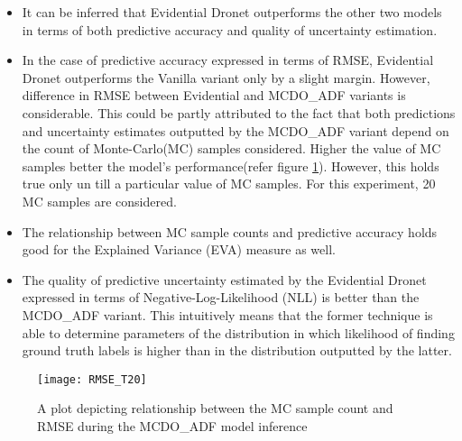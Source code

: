 \begin{itemize}
	\item It can be inferred that Evidential Dronet outperforms the other two models in terms of both predictive accuracy and quality of uncertainty estimation.
	\item In the case of predictive accuracy expressed in terms of RMSE, Evidential Dronet outperforms the Vanilla variant only by a slight margin. However, difference in RMSE between Evidential and MCDO\_ADF variants is considerable. This could be partly attributed to the fact that both predictions and uncertainty estimates outputted by the MCDO\_ADF variant depend on the count of Monte-Carlo(MC) samples considered. Higher the value of MC samples better the model's performance(refer figure \ref{fig_mc_count_vs_rmse}).  However, this holds true only un till a particular value of MC samples. For this experiment, 20 MC samples are considered. 
	\item The relationship between MC sample counts and predictive accuracy holds good for the Explained Variance (EVA) measure as well.
	\item The quality of predictive uncertainty estimated by the Evidential Dronet expressed in terms of Negative-Log-Likelihood (NLL) is better than the MCDO\_ADF variant. This intuitively means that the former technique is able to determine parameters of the distribution in which likelihood of finding ground truth labels is higher than in the distribution outputted by the latter.
\end{itemize}
\begin{figure}[h]
	\centering
	\texttt{[image: RMSE\_T20]}
	\caption{A plot depicting relationship between the MC sample count and RMSE during the MCDO\_ADF model inference}
	\label{fig_mc_count_vs_rmse}
\end{figure}
